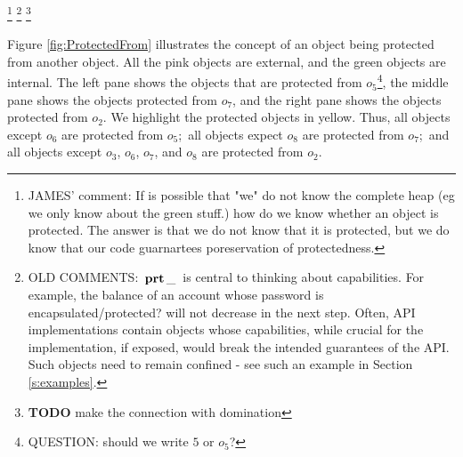 \footnote{JAMES' comment: If is possible that "we" do not know the complete heap (eg we only know about the green stuff.) how do we know whether an object is protected. The answer is that we do not know that it is protected, but we do know that our code guarnartees poreservation of protectedness.
}
\footnote{
OLD COMMENTS: ${{\, \mathbf{prt}\, \_\, }}$  is central to thinking about capabilities. For example, the balance of an account whose
  password is  encapsulated/protected?  will not decrease in the next step.
  Often, API implementations contain objects whose capabilities, while  crucial for the implementation, if exposed,
would break the intended guarantees of the API. Such objects need to remain confined - see
such an example in Section \ref{s:examples}. 
}
\footnote{{\textbf{TODO} make the connection with domination}}

Figure \ref{fig:ProtectedFrom} illustrates the concept of an object being protected from another object. All the pink objects are external, and the green objects are internal. The left pane shows the objects that are protected from $o_5$\footnote{QUESTION: should we write $5$ or $o_5$?}, the middle pane shows the objects protected from $o_7$, and the right pane shows the objects protected from $o_2$. We highlight the protected objects in yellow. Thus, all objects except $o_6$ are protected from $o_5$;\ all objects expect $o_8$ are protected from $o_7$;\ and all objects except $o_3$, $o_6$, $o_7$, and $o_8$ are protected from $o_2$. 


